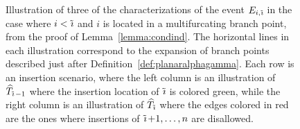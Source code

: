 \documentclass[a4paper, final]{amsart}
\theoremstyle{plain}
\theoremstyle{definition}
\newcommand{\That}[1][T]{\widehat{#1}}
\DeclareMathOperator{\tildei}{\tilde{\textit{\i}}}
\begin{document}
%
    \begin{figure}[t]
      \centering
      
      \caption[fig:ForbiddenEdges_1]{Illustration of three of the characterizations of the event $E_{i, \tildei}$ in the case where $i < \tildei$ and $i$ is located in a multifurcating branch point, from the proof of Lemma~\ref{lemma:condind}.
        The horizontal lines in each illustration correspond to the expansion of branch points described just after Definition~\ref{def:planaralphagamma}.
      Each row is an insertion scenario, where the left column is an illustration of $\That_{\tildei - 1}$ where the insertion location of $\tildei$ is colored green, while the right column is an illustration of $\That_{\tildei}$ where the edges colored in red are the ones where insertions of $\tildei + 1, \ldots, n$ are disallowed.}
      \label{fig:ForbiddenEdges_1}
    \end{figure}
\end{document}
